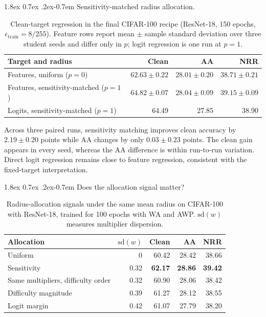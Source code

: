 \documentclass{article} %
\makeatletter
\theoremstyle{plain}
\renewcommand{\paragraph}{\@startsection{paragraph}{4}{\z@}%
  {1.8ex \@plus 0.7ex \@minus .2ex}{-0.7em}%
  {\normalfont\normalsize\bfseries}}
\makeatother
\begin{document}
\paragraph{Sensitivity-matched radius allocation.}
\begin{table}[!htbp]
  \centering
  \small
  \setlength{\tabcolsep}{5pt}
  \caption{
  Clean-target regression in the final CIFAR-100 recipe
  (ResNet-18, 150 epochs, \(\epsilon_{\mathrm{train}}=8/255\)).
  Feature rows report mean \(\pm\) sample standard deviation over three
  student seeds and differ only in \(p\); logit regression is one run at
  \(p=1\).
  }
  \label{tab:finalallocation}
  \begin{tabular}{lrrr}
    \toprule
    Target and radius & Clean & AA & NRR \\
    \midrule
    Features, uniform (\(p=0\))
      & \(62.63\pm0.22\)
      & \(28.01\pm0.20\)
      & \(38.71\pm0.21\) \\
    Features, sensitivity-matched (\(p=1\))
      & \(\mathbf{64.82\pm0.07}\)
      & \(\mathbf{28.04\pm0.09}\)
      & \(\mathbf{39.15\pm0.09}\) \\
    Logits, sensitivity-matched (\(p=1\))
      & 64.49 & 27.85 & 38.90 \\
    \bottomrule
  \end{tabular}
\end{table}

Across three paired runs, sensitivity matching improves clean accuracy by
\(2.19\pm0.20\) points while AA changes by only \(0.03\pm0.23\) points. The
clean gain appears in every seed, whereas the AA difference is within
run-to-run variation. Direct logit regression remains close to feature
regression, consistent with the fixed-target interpretation.

\paragraph{Does the allocation signal matter?}
\begin{table}[!htbp]
  \centering
  \small
  \setlength{\tabcolsep}{4.5pt}
  \caption{
  Radius-allocation signals under the same mean radius on CIFAR-100 with
  ResNet-18, trained for 100 epochs with WA and AWP.
  \(\mathrm{sd}(w)\) measures multiplier dispersion.
  }
  \label{tab:allocation}
  \begin{tabular}{lrrrr}
    \toprule
    Allocation & \(\mathrm{sd}(w)\) & Clean & AA & NRR \\
    \midrule
    Uniform
      & 0 & 60.42 & 28.42 & 38.66 \\
    Sensitivity
      & 0.32 & \textbf{62.17} & \textbf{28.86} & \textbf{39.42} \\
    Same multipliers, difficulty order
      & 0.32 & 60.90 & 28.06 & 38.42 \\
    Difficulty magnitude
      & 0.39 & 61.27 & 28.12 & 38.55 \\
    Logit margin
      & 0.42 & 61.07 & 27.79 & 38.20 \\
    \bottomrule
  \end{tabular}
\end{table}
\end{document}
